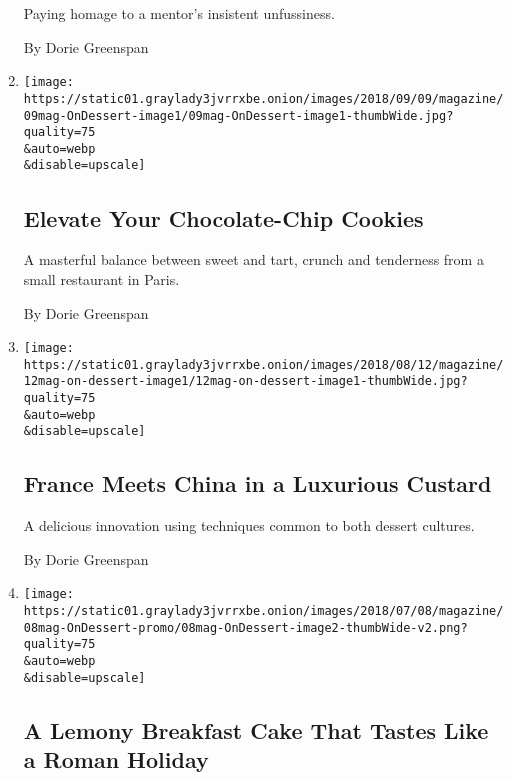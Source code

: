 \begin{enumerate}
  Paying homage to a mentor's insistent unfussiness.

  By Dorie Greenspan
\item
  \href{/2018/09/03/magazine/chocolate-chip-cookie-cranberry-paris.html}{}

  \texttt{[image: https://static01.graylady3jvrrxbe.onion/images/2018/09/09/magazine/09mag-OnDessert-image1/09mag-OnDessert-image1-thumbWide.jpg?quality=75\\\&auto=webp\\\&disable=upscale]}

  \hypertarget{elevate-your-chocolate-chip-cookies}{%
  \subsection{Elevate Your Chocolate-Chip
  Cookies}\label{elevate-your-chocolate-chip-cookies}}

  A masterful balance between sweet and tart, crunch and tenderness from
  a small restaurant in Paris.

  By Dorie Greenspan
\item
  \href{/2018/08/08/magazine/french-pastry-techniques-custard.html}{}

  \texttt{[image: https://static01.graylady3jvrrxbe.onion/images/2018/08/12/magazine/12mag-on-dessert-image1/12mag-on-dessert-image1-thumbWide.jpg?quality=75\\\&auto=webp\\\&disable=upscale]}

  \hypertarget{france-meets-china-in-a-luxurious-custard}{%
  \subsection{France Meets China in a Luxurious
  Custard}\label{france-meets-china-in-a-luxurious-custard}}

  A delicious innovation using techniques common to both dessert
  cultures.

  By Dorie Greenspan
\item
  \href{/2018/07/03/magazine/holiday-cake-roman-lemon-breakfast.html}{}

  \texttt{[image: https://static01.graylady3jvrrxbe.onion/images/2018/07/08/magazine/08mag-OnDessert-promo/08mag-OnDessert-image2-thumbWide-v2.png?quality=75\\\&auto=webp\\\&disable=upscale]}

  \hypertarget{a-lemony-breakfast-cake-that-tastes-like-a-roman-holiday}{%
  \subsection{A Lemony Breakfast Cake That Tastes Like a Roman
  Holiday}\label{a-lemony-breakfast-cake-that-tastes-like-a-roman-holiday}}


\end{enumerate}
